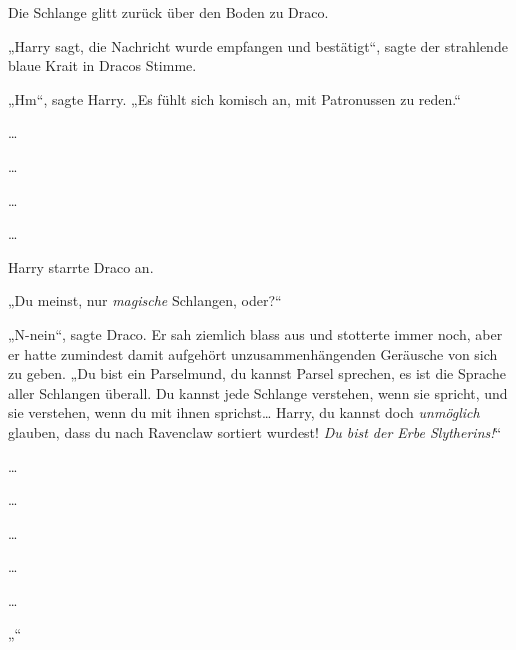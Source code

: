 Die Schlange glitt zurück über den Boden zu Draco.

„Harry sagt, die Nachricht wurde empfangen und bestätigt“, sagte der strahlende blaue Krait in Dracos Stimme.

„Hm“, sagte Harry. „Es fühlt sich komisch an, mit Patronussen zu reden.“

…

…

…

…



Harry starrte Draco an.

„Du meinst, nur \emph{magische} Schlangen, oder?“

„N-nein“, sagte Draco. Er sah ziemlich blass aus und stotterte immer noch, aber er hatte zumindest damit aufgehört unzusammenhängenden Geräusche von sich zu geben. „Du bist ein Parselmund, du kannst Parsel sprechen, es ist die Sprache aller Schlangen überall. Du kannst jede Schlange verstehen, wenn sie spricht, und sie verstehen, wenn du mit ihnen sprichst… Harry, du kannst doch \emph{unmöglich} glauben, dass du nach Ravenclaw sortiert wurdest! \emph{Du bist der Erbe Slytherins!}“

…

…

…

…

…

„“


